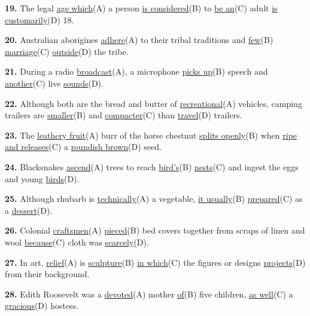 \documentclass[12pt]{article}
\begin{document}
\noindent\textbf{19.} The legal \uline{age which}(A) a person \uline{is considered}(B) to \uline{be an}(C) adult \uline{is customarily}(D) 18.
\par
\vspace{\questionblockgap}
\noindent\textbf{20.} Australian aborigines \uline{adhere}(A) to their tribal traditions and \uline{few}(B) \uline{marriage}(C) \uline{outside}(D) the tribe.
\par
\vspace{\questionblockgap}
\noindent\textbf{21.} During a radio \uline{broadcast}(A), a microphone \uline{picks up}(B) speech and \uline{another}(C) live \uline{sounds}(D).
\par
\vspace{\questionblockgap}
\noindent\textbf{22.} Although both are the bread and butter of \uline{recreational}(A) vehicles, camping trailers are \uline{smaller}(B) and \uline{compacter}(C) than \uline{travel}(D) trailers.
\par
\vspace{\questionblockgap}
\noindent\textbf{23.} The \uline{leathery fruit}(A) burr of the horse chestnut \uline{splits openly}(B) when \uline{ripe and releases}(C) a \uline{roundish brown}(D) seed.
\par
\vspace{\questionblockgap}
\noindent\textbf{24.} Blacksnakes \uline{ascend}(A) trees to reach \uline{bird's}(B) \uline{nests}(C) and ingest the eggs and young \uline{birds}(D).
\par
\vspace{\questionblockgap}
\noindent\textbf{25.} Although rhubarb is \uline{technically}(A) a vegetable, \uline{it usually}(B) \uline{prepared}(C) as a \uline{dessert}(D).
\par
\vspace{\questionblockgap}
\noindent\textbf{26.} Colonial \uline{craftsmen}(A) \uline{pieced}(B) bed covers together from scraps of linen and wool \uline{because}(C) cloth was \uline{scarcely}(D).
\par
\vspace{\questionblockgap}
\noindent\textbf{27.} In art, \uline{relief}(A) is \uline{sculpture}(B) \uline{in which}(C) the figures or designs \uline{projects}(D) from their background.
\par
\vspace{\questionblockgap}
\noindent\textbf{28.} Edith Roosevelt was a \uline{devoted}(A) mother \uline{of}(B) five children, \uline{as well}(C) a \uline{gracious}(D) hostess.
\par
\end{document}
